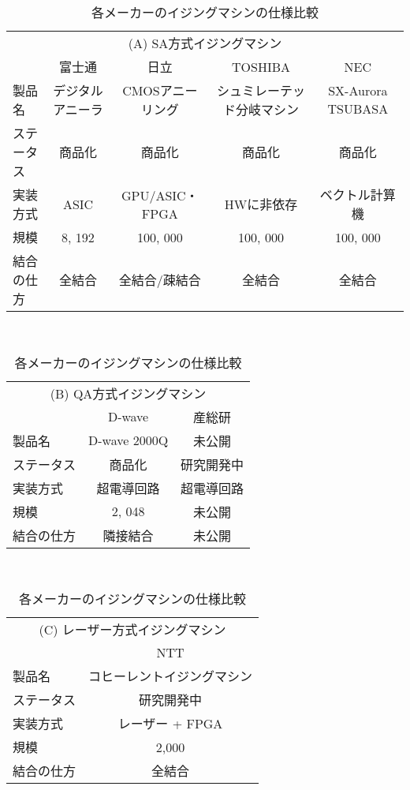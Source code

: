 \documentclass[12pt, dvipdfmx]{jmaster}
\theoremstyle{definition}
\begin{document}
\begin{table}[H]
	\caption{各メーカーのイジングマシンの仕様比較}
	\label{tb:ising_machine}
	\centering
	\scriptsize
	\begin{tabular}{lcccc}
		\multicolumn{5}{c}{\normalsize (A) SA方式イジングマシン} \\
		& 富士通 & 日立 & TOSHIBA & NEC\\
		\hline\hline
		製品名 & デジタルアニーラ & CMOSアニーリング & シュミレーテッド分岐マシン & SX-Aurora TSUBASA\\
		ステータス & 商品化 & 商品化 & 商品化 & 商品化\\
		実装方式 & ASIC & GPU/ASIC・FPGA & HWに非依存 & ベクトル計算機\\
		規模 & 8, 192 & 100, 000 & 100, 000 & 100, 000 \\
		結合の仕方 & 全結合 & 全結合/疎結合 & 全結合 & 全結合\\
		\hline
	\end{tabular}
	\vspace{0.3in} \\
	\normalsize
	\begin{tabular}{lcc}
		\multicolumn{3}{c}{(B) QA方式イジングマシン} \\
		& D-wave & 産総研 \\
		\hline\hline
		製品名 & D-wave 2000Q & 未公開\\
		ステータス & 商品化 & 研究開発中\\
		実装方式 & 超電導回路 & 超電導回路\\
		規模 & 2, 048 & 未公開\\
		結合の仕方 & 隣接結合 & 未公開\\
		\hline
	\end{tabular}
	\vspace{0.3in} \\
	\begin{tabular}{lc}
		\multicolumn{2}{c}{(C) レーザー方式イジングマシン} \\
		& NTT\\
		\hline\hline
		製品名 & コヒーレントイジングマシン\\
		ステータス & 研究開発中\\
		実装方式 & レーザー + FPGA\\
		規模 & 2,000\\
		結合の仕方 & 全結合\\
		\hline
	\end{tabular}
\end{table}
\end{document}
